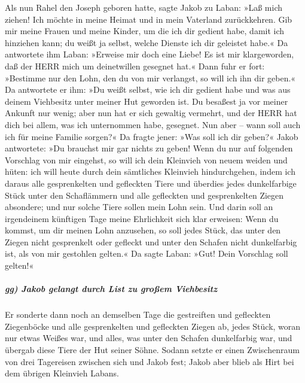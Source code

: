  Als nun Rahel den Joseph geboren hatte, sagte Jakob zu
Laban: »Laß mich ziehen! Ich möchte in meine Heimat und in mein
Vaterland zurückkehren.  Gib mir meine Frauen und meine
Kinder, um die ich dir gedient habe, damit ich hinziehen kann; du weißt
ja selbst, welche Dienste ich dir geleistet habe.«  Da
antwortete ihm Laban: »Erweise mir doch eine Liebe! Es ist mir
klargeworden, daß der HERR mich um deinetwillen gesegnet hat.«
 Dann fuhr er fort: »Bestimme nur den Lohn, den du von
mir verlangst, so will ich ihn dir geben.«  Da antwortete
er ihm: »Du weißt selbst, wie ich dir gedient habe und was aus deinem
Viehbesitz unter meiner Hut geworden ist.  Du besaßest ja
vor meiner Ankunft nur wenig; aber nun hat er sich gewaltig vermehrt,
und der HERR hat dich bei allem, was ich unternommen habe, gesegnet. Nun
aber -- wann soll auch ich für meine Familie sorgen?«  Da
fragte jener: »Was soll ich dir geben?« Jakob antwortete: »Du brauchst
mir gar nichts zu geben! Wenn du nur auf folgenden Vorschlag von mir
eingehst, so will ich dein Kleinvieh von neuem weiden und hüten:
 ich will heute durch dein sämtliches Kleinvieh
hindurchgehen, indem ich daraus alle gesprenkelten und gefleckten Tiere
und überdies jedes dunkelfarbige Stück unter den Schaflämmern und alle
gefleckten und gesprenkelten Ziegen absondere; und nur solche Tiere
sollen mein Lohn sein.  Und darin soll an irgendeinem
künftigen Tage meine Ehrlichkeit sich klar erweisen: Wenn du kommst, um
dir meinen Lohn anzusehen, so soll jedes Stück, das unter den Ziegen
nicht gesprenkelt oder gefleckt und unter den Schafen nicht dunkelfarbig
ist, als von mir gestohlen gelten.«  Da sagte Laban:
»Gut! Dein Vorschlag soll gelten!«

\hypertarget{gg-jakob-gelangt-durch-list-zu-grouxdfem-viehbesitz}{%
\subparagraph{gg) Jakob gelangt durch List zu großem
Viehbesitz}\label{gg-jakob-gelangt-durch-list-zu-grouxdfem-viehbesitz}}

 Er sonderte dann noch an demselben Tage die gestreiften
und gefleckten Ziegenböcke und alle gesprenkelten und gefleckten Ziegen
ab, jedes Stück, woran nur etwas Weißes war, und alles, was unter den
Schafen dunkelfarbig war, und übergab diese Tiere der Hut seiner Söhne.
 Sodann setzte er einen Zwischenraum von drei Tagereisen
zwischen sich und Jakob fest; Jakob aber blieb als Hirt bei dem übrigen
Kleinvieh Labans.

